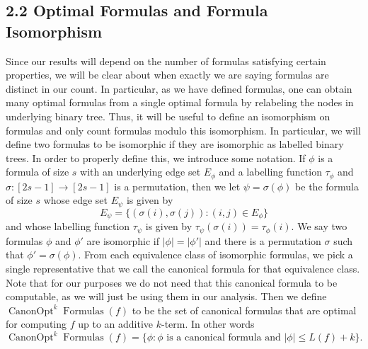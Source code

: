 \documentclass[10pt,a4paper]{article}
\newcommand{\Canon}[1]{\operatorname{CanonOpt}^{#1}\!\operatorname{Formulas}}
\begin{document}
\subsection*{2.2 Optimal Formulas and Formula Isomorphism}
Since our results will depend on the number of formulas satisfying certain properties, we will be clear about when exactly we are saying formulas are distinct in our count.
In particular, as we have defined formulas, one can obtain many optimal formulas from a single optimal formula by relabeling the nodes in underlying binary tree.
Thus, it will be useful to define an isomorphism on formulas and only count formulas modulo this isomorphism. In particular, we will define two formulas to be isomorphic if they are isomorphic as labelled binary trees.
In order to properly define this, we introduce some notation. If $\phi$ is a formula of size $s$ with an underlying edge set $E_\phi$ and a labelling function $\tau_\phi$ and $\sigma:[2s-1]\to[2s-1]$ is a permutation, then we let $\psi=\sigma(\phi)$ be the formula of size $s$ whose edge set $E_\psi$ is given by
\[E_\psi=\{(\sigma(i),\sigma(j)):(i,j)\in E_\phi\}\]
and whose labelling function $\tau_\psi$ is given by $\tau_\psi(\sigma(i))=\tau_\phi(i)$.
We say two formulas $\phi$ and $\phi'$ are isomorphic if $|\phi|=|\phi'|$ and there is a permutation $\sigma$ such that $\phi'=\sigma(\phi)$.
From each equivalence class of isomorphic formulas, we pick a single representative that we call the canonical formula for that equivalence class. Note that for our purposes we do not need that this canonical formula to be computable, as we will just be using them in our analysis. Then we define $\Canon{k}(f)$ to be the set of canonical formulas that are optimal for computing $f$ up to an additive $k$-term. In other words
\[\Canon{k}(f)=\{\phi:\phi\text{ is a canonical formula and }|\phi|\leq L(f)+k\}.\]
\end{document}
